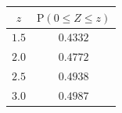 {\setlength{\tabcolsep}{5pt}\renewcommand{\arraystretch}{1.25}%
\begin{tabular}{|c|c|}
\hline
$z$ & $\mathrm{P}(0\le Z\le z)$ \\
\hline
$1.5$ & $0.4332$ \\
\hline
$2.0$ & $0.4772$ \\
\hline
$2.5$ & $0.4938$ \\
\hline
$3.0$ & $0.4987$ \\
\hline
\end{tabular}}
